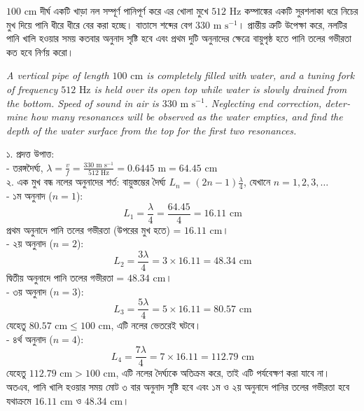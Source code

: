 \documentclass[12pt, a4paper]{article}
\begin{document}
\vspace{1.5em}

\begin{tcolorbox}[questionbox={প্রশ্ন (Question) 5}]
\noindent
$100\text{ cm}$ দীর্ঘ একটি খাড়া নল সম্পূর্ণ পানিপূর্ণ করে এর খোলা মুখে $512\text{ Hz}$ কম্পাঙ্কের একটি সুরশলাকা ধরে নিচের মুখ দিয়ে পানি ধীরে ধীরে বের করা হচ্ছে। বাতাসে শব্দের বেগ $330\text{ m s}^{-1}$। প্রান্তীয় ত্রুটি উপেক্ষা করে, নলটির পানি খালি হওয়ার সময় কতবার অনুনাদ সৃষ্টি হবে এবং প্রথম দুটি অনুনাদের ক্ষেত্রে বায়ুপৃষ্ঠ হতে পানি তলের গভীরতা কত হবে নির্ণয় করো।

\vspace{0.8em}
\begin{english}
\noindent\textit{\color{darkgray}
A vertical pipe of length $100\text{ cm}$ is completely filled with water, and a tuning fork of frequency $512\text{ Hz}$ is held over its open top while water is slowly drained from the bottom. Speed of sound in air is $330\text{ m s}^{-1}$. Neglecting end correction, determine how many resonances will be observed as the water empties, and find the depth of the water surface from the top for the first two resonances.
}
\end{english}
\end{tcolorbox}

\vspace{1em}

\begin{tcolorbox}[solutionbox={সমাধান (Solution)}]
\noindent
১. প্রদত্ত উপাত্ত: \\
- তরঙ্গদৈর্ঘ্য, $\lambda = \frac{v}{f} = \frac{330\text{ m s}^{-1}}{512\text{ Hz}} = 0.6445\text{ m} = 64.45\text{ cm}$ \\
২. এক মুখ বন্ধ নলের অনুনাদের শর্ত: বায়ুস্তম্ভের দৈর্ঘ্য $L_n = (2n - 1)\frac{\lambda}{4}$, যেখানে $n = 1, 2, 3, \dots$ \\
- ১ম অনুনাদ ($n=1$):
\[ L_1 = \frac{\lambda}{4} = \frac{64.45}{4} = 16.11\text{ cm} \]
প্রথম অনুনাদে পানি তলের গভীরতা (উপরের মুখ হতে) = $16.11\text{ cm}$। \\
- ২য় অনুনাদ ($n=2$):
\[ L_2 = \frac{3\lambda}{4} = 3 \times 16.11 = 48.34\text{ cm} \]
দ্বিতীয় অনুনাদে পানি তলের গভীরতা = $48.34\text{ cm}$। \\
- ৩য় অনুনাদ ($n=3$):
\[ L_3 = \frac{5\lambda}{4} = 5 \times 16.11 = 80.57\text{ cm} \]
যেহেতু $80.57\text{ cm} \le 100\text{ cm}$, এটি নলের ভেতরেই ঘটবে। \\
- ৪র্থ অনুনাদ ($n=4$):
\[ L_4 = \frac{7\lambda}{4} = 7 \times 16.11 = 112.79\text{ cm} \]
যেহেতু $112.79\text{ cm} > 100\text{ cm}$, এটি নলের দৈর্ঘ্যকে অতিক্রম করে, তাই এটি পর্যবেক্ষণ করা যাবে না। \\
অতএব, পানি খালি হওয়ার সময় মোট ৩ বার অনুনাদ সৃষ্টি হবে এবং ১ম ও ২য় অনুনাদে পানির তলের গভীরতা হবে যথাক্রমে $16.11\text{ cm}$ ও $48.34\text{ cm}$।
\end{tcolorbox}
\end{document}
